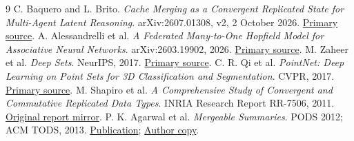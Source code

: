 \documentclass[10pt]{article}
\begin{document}
\begin{thebibliography}{9}
 C. Baquero and L. Brito.
\emph{Cache Merging as a Convergent Replicated State for Multi-Agent Latent Reasoning}.
arXiv:2607.01308, v2, 2 October 2026.
\href{https://arxiv.org/abs/2607.01308v2}{Primary source}.
 A. Alessandrelli et al.
\emph{A Federated Many-to-One Hopfield Model for Associative Neural Networks}.
arXiv:2603.19902, 2026.
\href{https://arxiv.org/abs/2603.19902}{Primary source}.
 M. Zaheer et al. \emph{Deep Sets}. NeurIPS, 2017.
\href{https://arxiv.org/abs/1703.06114}{Primary source}.
 C. R. Qi et al.
\emph{PointNet: Deep Learning on Point Sets for 3D Classification and Segmentation}.
CVPR, 2017. \href{https://arxiv.org/abs/1612.00593}{Primary source}.
 M. Shapiro et al.
\emph{A Comprehensive Study of Convergent and Commutative Replicated Data Types}.
INRIA Research Report RR-7506, 2011.
\href{https://dsf.berkeley.edu/cs286/papers/crdt-tr2011.pdf}{Original report mirror}.
 P. K. Agarwal et al. \emph{Mergeable Summaries}.
PODS 2012; ACM TODS, 2013.
\href{https://doi.org/10.1145/2500128}{Publication};
\href{https://users.cs.duke.edu/~pankaj/publications/papers/merge-summ.pdf}{Author copy}.
\end{thebibliography}
\end{document}
